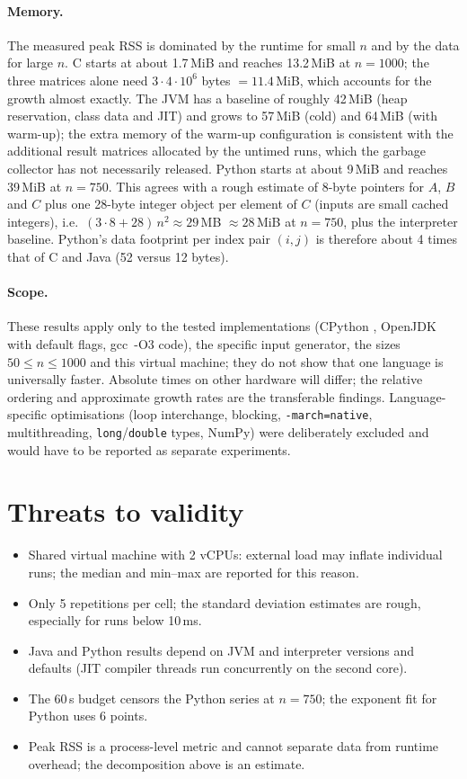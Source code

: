\documentclass[11pt,a4paper]{article}
\begin{document}
\paragraph{Memory.}
The measured peak RSS is dominated by the runtime for small $n$ and by the data for large $n$.
C starts at about 1.7\,MiB and reaches 13.2\,MiB at $n=1000$; the three matrices alone need
$3\cdot4\cdot10^6$ bytes $=11.4$\,MiB, which accounts for the growth almost exactly.
The JVM has a baseline of roughly 42\,MiB (heap reservation, class data and JIT) and grows to 57\,MiB (cold)
and 64\,MiB (with warm-up); the extra memory of the warm-up configuration is consistent with the additional result
matrices allocated by the untimed runs, which the garbage collector has not necessarily released.
Python starts at about 9\,MiB and reaches 39\,MiB at $n=750$. This agrees with a rough estimate of 8-byte pointers for $A$, $B$
and $C$ plus one 28-byte integer object per element of $C$ (inputs are small cached integers), i.e.\ $(3\cdot 8 + 28)\,n^2 \approx 29$\,MB $\approx 28$\,MiB at $n=750$,
plus the interpreter baseline. Python's data footprint per index pair $(i,j)$ is therefore about 4 times that of C and Java
(52 versus 12 bytes).

\paragraph{Scope.}
These results apply only to the tested implementations (CPython \EnvPython, OpenJDK with default flags, gcc \,-O3 code),
the specific input generator, the sizes $50\le n\le1000$ and this virtual machine; they do not show that one language is universally
faster. Absolute times on other hardware will differ; the relative ordering and approximate growth rates are the
transferable findings. Language-specific optimisations (loop interchange, blocking, \texttt{-march=native}, multithreading,
\texttt{long}/\texttt{double} types, NumPy) were deliberately excluded and would have to be reported as separate experiments.

\section{Threats to validity}
\begin{itemize}
  \item Shared virtual machine with 2 vCPUs: external load may inflate individual runs; the median and min--max are reported for this reason.
  \item Only 5 repetitions per cell; the standard deviation estimates are rough, especially for runs below 10\,ms.
  \item Java and Python results depend on JVM and interpreter versions and defaults (JIT compiler threads run concurrently on the second core).
  \item The 60\,s budget censors the Python series at $n=750$; the exponent fit for Python uses 6 points.
  \item Peak RSS is a process-level metric and cannot separate data from runtime overhead; the decomposition above is an estimate.
\end{itemize}
\end{document}
